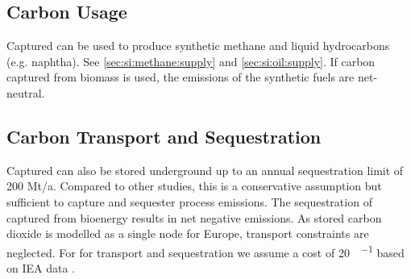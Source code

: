 \subsection{Carbon Usage}

Captured \co can be used to produce synthetic methane and liquid hydrocarbons
(e.g. naphtha). See \cref{sec:si:methane:supply} and \cref{sec:si:oil:supply}.
If carbon captured from biomass is used, the \co emissions of the synthetic
fuels are net-neutral.

\subsection{Carbon Transport and Sequestration}

Captured \co can also be stored underground up to an annual sequestration limit
of 200 Mt\co/a. Compared to other studies, this is a conservative assumption but
sufficient to capture and sequester process emissions. The sequestration of
captured \co from bioenergy results in net negative emissions. As stored carbon
dioxide is modelled as a single node for Europe, transport constraints are
neglected. For for \co transport and sequestration we assume a cost of
\SI{20}{\sieuro\per\tco} based on IEA data \citeS{}.

